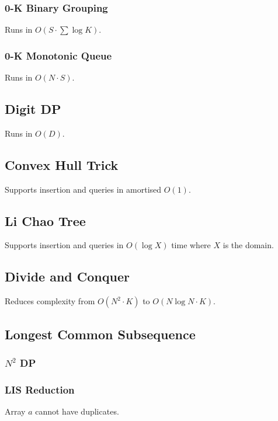 \documentclass{article}
\begin{document}
\subsubsection{0-K Binary Grouping}
Runs in $O(S \cdot \sum \log K)$.


\subsubsection{0-K Monotonic Queue}
Runs in $O(N \cdot S)$.


\subsection{Digit DP}
Runs in $O(D)$.


\subsection{Convex Hull Trick}
Supports insertion and queries in amortised $O(1)$.


\subsection{Li Chao Tree}
Supports insertion and queries in $O(\log X)$ time where $X$ is the domain.


\subsection{Divide and Conquer}
Reduces complexity from $O(N^2 \cdot K)$ to $O(N \log N \cdot K)$.


\subsection{Longest Common Subsequence}
\subsubsection{$N^2$ DP}


\subsubsection{LIS Reduction}
Array $a$ cannot have duplicates.

\end{document}

